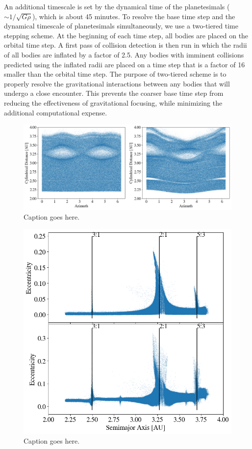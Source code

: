 \documentclass[twocolumn]{aastex63}
\begin{document}
An additional timescale is set by the dynamical time of the planetesimals ($\sim 1/\sqrt{G \rho}$), which is about 45 minutes. To 
resolve the base time step and the dynamical timescale of planetesimals simultaneously, we use a two-tiered time stepping scheme. 
At the beginning of each time step, all bodies are placed on the orbital time step. A first pass of collision detection is then run in 
which the radii of all bodies are inflated by a factor of 2.5. Any bodies with imminent collisions predicted using the inflated radii are 
placed on a time step that is a factor of 16 smaller than the orbital time step. The purpose of two-tiered scheme is to properly resolve 
the gravitational interactions between any bodies that will undergo a close encounter. This prevents the coarser base time step from 
reducing the effectiveness of gravitational focusing, while minimizing the additional computational expense.

\begin{figure}
    \includegraphics[width=\textwidth]{figures/rtheta.png}
    \caption{Caption goes here.\label{fig:rtheta}}
\end{figure}

\begin{figure}
    \includegraphics[width=\columnwidth]{figures/ae.png}
    \caption{Caption goes here.\label{fig:ae}}
\end{figure}
\end{document}
